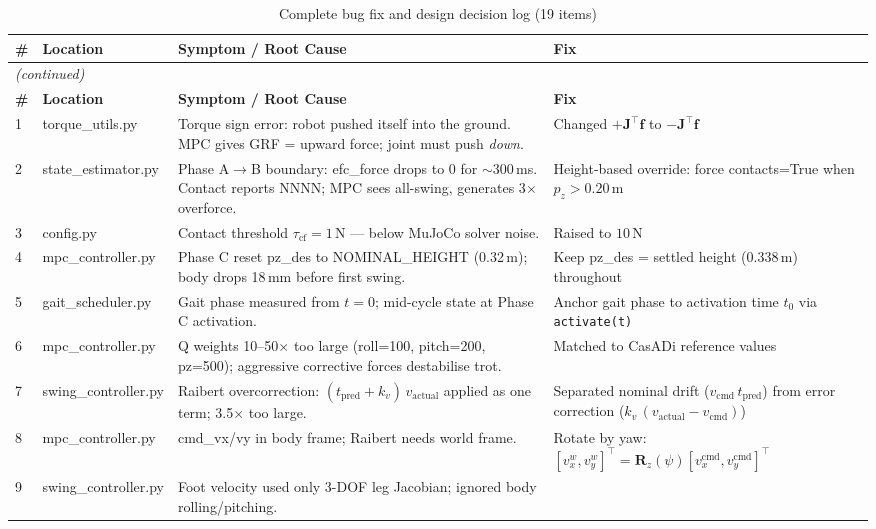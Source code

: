 \documentclass[12pt,a4paper]{report}
\newcommand{\vect}[1]{\bm{#1}}
\newcommand{\mat}[1]{\mathbf{#1}}
\begin{document}
\begin{longtable}{p{0.4cm}p{3.2cm}p{5cm}p{5.5cm}}
\caption{Complete bug fix and design decision log (19 items)}\\
\toprule
\textbf{\#} & \textbf{Location} & \textbf{Symptom / Root Cause} & \textbf{Fix} \\
\midrule
\endfirsthead
\multicolumn{4}{l}{\textit{(continued)}}\\
\toprule
\textbf{\#} & \textbf{Location} & \textbf{Symptom / Root Cause} & \textbf{Fix} \\
\midrule
\endhead
\bottomrule
\endfoot

1 & torque\_utils.py & Torque sign error: robot pushed itself into the ground.
    MPC gives GRF = upward force; joint must push \emph{down}.
  & Changed $+\mat{J}^\top\vect{f}$ to $-\mat{J}^\top\vect{f}$ \\
2 & state\_estimator.py & Phase A$\to$B boundary: efc\_force drops to 0 for $\sim$300\,ms.
    Contact reports NNNN; MPC sees all-swing, generates 3$\times$ overforce.
  & Height-based override: force contacts=True when $p_z > 0.20\,\text{m}$ \\
3 & config.py & Contact threshold $\tau_\text{cf} = 1\,\text{N}$ — below MuJoCo solver noise.
  & Raised to $10\,\text{N}$ \\
4 & mpc\_controller.py & Phase C reset pz\_des to NOMINAL\_HEIGHT (0.32\,m); body drops 18\,mm before first swing.
  & Keep pz\_des = settled height (0.338\,m) throughout \\
5 & gait\_scheduler.py & Gait phase measured from $t=0$; mid-cycle state at Phase C activation.
  & Anchor gait phase to activation time $t_0$ via \texttt{activate(t)} \\
6 & mpc\_controller.py & Q weights 10--50$\times$ too large (roll=100, pitch=200, pz=500); aggressive corrective forces destabilise trot.
  & Matched to CasADi reference values \\
7 & swing\_controller.py & Raibert overcorrection: $(t_\text{pred} + k_v)\,v_\text{actual}$ applied as one term; 3.5$\times$ too large.
  & Separated nominal drift ($v_\text{cmd}\,t_\text{pred}$) from error correction ($k_v\,(v_\text{actual}-v_\text{cmd})$) \\
8 & mpc\_controller.py & cmd\_vx/vy in body frame; Raibert needs world frame.
  & Rotate by yaw: $[v_x^w, v_y^w]^\top = \mat{R}_z(\psi)[v_x^\text{cmd}, v_y^\text{cmd}]^\top$ \\
9 & swing\_controller.py & Foot velocity used only 3-DOF leg Jacobian; ignored body rolling/pitching.

\end{longtable}
\end{document}
